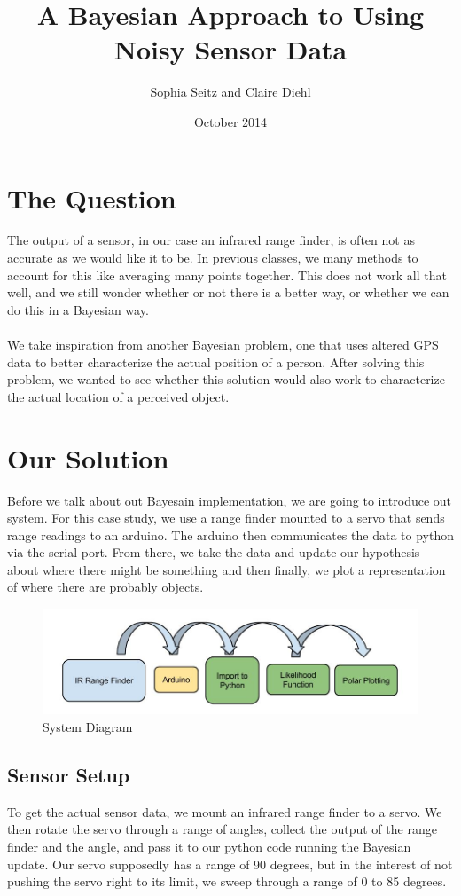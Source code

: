 \documentclass{article}
\title{A Bayesian Approach to Using Noisy Sensor Data}
\author{Sophia Seitz and Claire Diehl}
\date{October 2014}
\begin{document}
\maketitle

\section{The Question}
The output of a sensor, in our case an infrared range finder, is often not as accurate as we would like it to be. In previous classes, we many methods to account for this like averaging many points together. This does not work all that well, and we still wonder whether or not there is a better way, or whether we can do this in a Bayesian way.
\\ \\
We take inspiration from another Bayesian problem, one that uses altered GPS data to better characterize the actual position of a person. After solving this problem, we wanted to see whether this solution would also work to characterize the actual location of a perceived object.

\section{Our Solution}
Before we talk about out Bayesain implementation, we are going to introduce out system. For this case study, we use a range finder mounted to a servo that sends range readings to an arduino. The arduino then communicates the data to python via the serial port. From there, we take the data and update our hypothesis about where there might be something and then finally, we plot a representation of where there are probably objects. 

\begin{figure}[h!]
\centering
\includegraphics[width=0.6\columnwidth]{BayesSystem.jpg}
\caption{System Diagram}
\label{fig:univerise}
\end{figure}

\subsection{Sensor Setup}
To get the actual sensor data, we mount an infrared range finder to a servo. We then rotate the servo through a range of angles, collect the output of the range finder and the angle, and pass it to our python code running the Bayesian update. Our servo supposedly has a range of 90 degrees, but in the interest of not pushing the servo right to its limit, we sweep through a range of 0 to 85 degrees.
\end{document}
